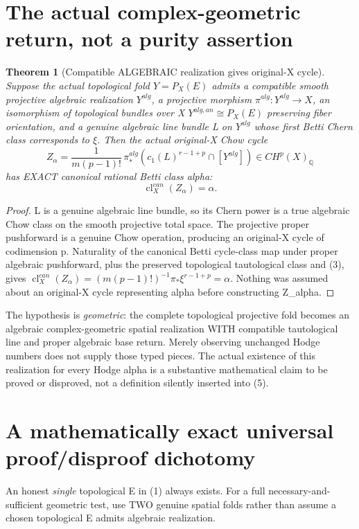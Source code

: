\documentclass[11pt]{article}
\newtheorem{theorem}{Theorem}
\begin{document}
\section{The actual complex-geometric return, not a purity assertion}
\begin{theorem}[Compatible ALGEBRAIC realization gives original-X cycle]
Suppose the actual topological fold $Y=P_X(E)$ admits
a compatible smooth projective algebraic realization
$Y^{alg}$, a projective morphism $\pi^{alg}:Y^{alg}\to X$,
an isomorphism of topological bundles over X
$Y^{alg,an}\cong P_X(E)$ preserving fiber orientation,
and a genuine algebraic line bundle L on $Y^{alg}$
whose first Betti Chern class corresponds to $\xi$.
Then the actual original-X Chow cycle
\[
 \boxed{
 Z_\alpha=
  \frac{1}{m(p-1)!}\,
  \pi^{alg}_*\!\left(c_1(L)^{r-1+p}\cap[Y^{alg}]\right)
   \in CH^p(X)_{\mathbb Q}
 }                                                        \tag{5}
\]
has EXACT canonical rational Betti class alpha:
\[
 \boxed{\operatorname{cl}_X^{can}(Z_\alpha)=\alpha.}     \tag{6}
\]
\end{theorem}
\begin{proof}
L is a genuine algebraic line bundle, so its Chern
power is a true algebraic Chow class on the smooth
projective total space. The projective proper
pushforward is a genuine Chow operation, producing
an original-X cycle of codimension p.
Naturality of the canonical Betti cycle-class map
under proper algebraic pushforward, plus the preserved
topological tautological class and (3), gives
$\operatorname{cl}_X^{can}(Z_\alpha)
=(m(p-1)!)^{-1}\pi_*\xi^{r-1+p}=\alpha$.
Nothing was assumed about an original-X cycle
representing alpha before constructing Z_alpha.
\end{proof}
The hypothesis is \emph{geometric}: the complete
topological projective fold becomes an algebraic
complex-geometric spatial realization WITH compatible
tautological line and proper algebraic base return.
Merely observing unchanged Hodge numbers does not supply
those typed pieces. The actual existence of this
realization for every Hodge alpha is a substantive
mathematical claim to be proved or disproved, not a
definition silently inserted into (5).

\section{A mathematically exact universal proof/disproof dichotomy}
An honest \emph{single} topological E in (1) always
exists. For a full necessary-and-sufficient geometric
test, use TWO genuine spatial folds rather than assume
a chosen topological E admits algebraic realization.
\end{document}
